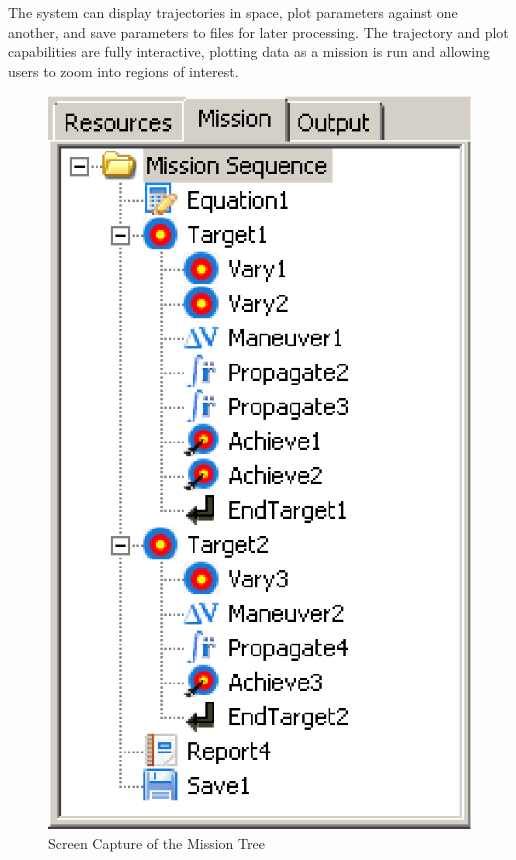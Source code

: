 The system can display trajectories in space, plot parameters against one another, and save parameters to files for later processing.  The trajectory and plot capabilities are fully interactive, plotting data as a mission is run and allowing users to zoom into regions of interest.
%
\begin{figure}[tb]
\begin{center}
\includegraphics*[scale=0.58]{Images/MissionTreeScreenShot.eps}
\caption{\label{fig:MissionTreeCapture} Screen Capture of the Mission Tree}
\end{center}
\end{figure}

